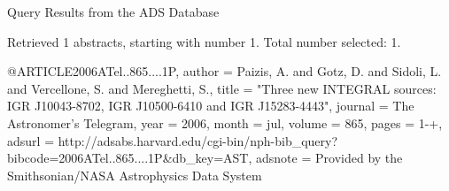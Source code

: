 Query Results from the ADS Database


Retrieved 1 abstracts, starting with number 1.  Total number selected: 1.

@ARTICLE{2006ATel..865....1P,
   author = {{Paizis}, A. and {Gotz}, D. and {Sidoli}, L. and {Vercellone}, S. and 
	{Mereghetti}, S.},
    title = "{Three new INTEGRAL sources: IGR J10043-8702, IGR J10500-6410 and IGR J15283-4443}",
  journal = {The Astronomer's Telegram},
     year = 2006,
    month = jul,
   volume = 865,
    pages = {1-+},
   adsurl = {http://adsabs.harvard.edu/cgi-bin/nph-bib_query?bibcode=2006ATel..865....1P&db_key=AST},
  adsnote = {Provided by the Smithsonian/NASA Astrophysics Data System}
}


